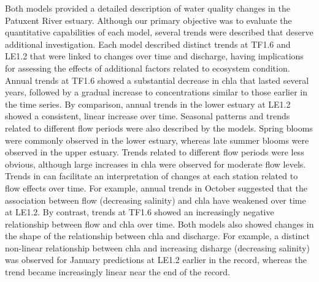 \documentclass[letterpaper,12pt,oneside]{article}\usepackage[]{graphicx}\usepackage[]{color}
\begin{document}
Both models provided a detailed description of water quality changes in the Patuxent River estuary.  Although our primary objective was to evaluate the quantitative capabilities of each model, several trends were described that deserve additional investigation.  Each model described distinct trends at TF1.6 and LE1.2 that were linked to changes over time and discharge, having implications for assessing the effects of additional factors related to ecosystem condition.  Annual trends at TF1.6 showed a substantial decrease in \ac{chla} that lasted several years, followed by a gradual increase to concentrations similar to those earlier in the time series.  By comparison, annual trends in the lower estuary at LE1.2 showed a consistent, linear increase over time.  Seasonal patterns and trends related to different flow periods were also described by the models.  Spring blooms were commonly observed in the lower estuary, whereas late summer blooms were observed in the upper estuary.  Trends related to different flow periods were less obvious, although large increases in \ac{chla} were observed for moderate flow levels.  Trends in  can facilitate an interpretation of changes at each station related to flow effects over time.  For example, annual trends in October suggested that the association between flow (decreasing salinity) and \ac{chla} have weakened over time at LE1.2.  By contrast, trends at TF1.6 showed an increasingly negative relationship between flow and \ac{chla} over time.  Both models also showed changes in the shape of the relationship between \ac{chla} and discharge.  For example, a distinct non-linear relationship between \ac{chla} and increasing disharge (decreasing salinity) was observed for January predictions at LE1.2 earlier in the record, whereas the trend became increasingly linear near the end of the record.
\end{document}
